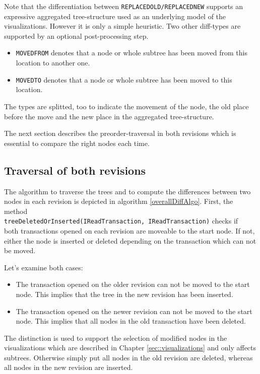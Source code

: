 Note that the differentiation between \texttt{REPLACEDOLD/REPLACEDNEW} supports an expressive aggregated tree-structure used as an underlying model of the visualizations. However it is only a simple heuristic. Two other diff-types are supported by an optional post-processing step.

\begin{itemize}
\item \texttt{MOVEDFROM} denotes that a node or whole subtree has been moved from this location to another one.
\item \texttt{MOVEDTO} denotes that a node or whole subtree has been moved to this location.
\end{itemize}

The types are splitted, too to indicate the movement of the node, the old place before the move and the new place in the aggregated tree-structure.

The next section describes the preorder-traversal in both revisions which is essential to compare the right nodes each time.

\subsection{Traversal of both revisions}
The algorithm to traverse the trees and to compute the differences between two nodes in each revision is depicted in algorithm \ref{overallDiffAlgo}. First, the method\\ \texttt{treeDeletedOrInserted(IReadTransaction, IReadTransaction)} checks if\\ both transactions opened on each revision are moveable to the start node. If not, either the node is inserted or deleted depending on the transaction which can not be moved.

Let's examine both cases:
\begin{itemize}
\item
The transaction opened on the older revision can not be moved to the start node. This implies that the tree in the new revision has been inserted.
\item
The transaction opened on the newer revision can not be moved to the start node. This implies that all nodes in the old transaction have been deleted.
\end{itemize}

The distinction is used to support the selection of modified nodes in the visualizations which are described in Chapter \ref{sec::visualizations} and only affects subtrees. Otherwise simply put all nodes in the old revision are deleted, whereas all nodes in the new revision are inserted.

